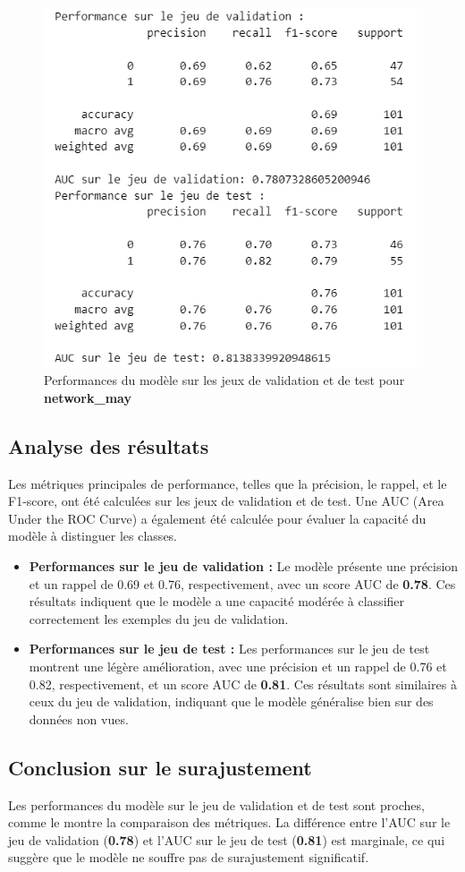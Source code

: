 \begin{figure}[H]
    \centering
    \includegraphics[width=0.7\linewidth]{OVERFIT.png}
    \caption{Performances du modèle sur les jeux de validation et de test pour \textbf{network\_may}}
    \label{fig:overfit}
\end{figure}

\subsection{Analyse des résultats}
Les métriques principales de performance, telles que la précision, le rappel, et le F1-score, ont été calculées sur les jeux de validation et de test. Une AUC (Area Under the ROC Curve) a également été calculée pour évaluer la capacité du modèle à distinguer les classes.

\begin{itemize}
    \item \textbf{Performances sur le jeu de validation :} Le modèle présente une précision et un rappel de 0.69 et 0.76, respectivement, avec un score AUC de \textbf{0.78}. Ces résultats indiquent que le modèle a une capacité modérée à classifier correctement les exemples du jeu de validation.
    \item \textbf{Performances sur le jeu de test :} Les performances sur le jeu de test montrent une légère amélioration, avec une précision et un rappel de 0.76 et 0.82, respectivement, et un score AUC de \textbf{0.81}. Ces résultats sont similaires à ceux du jeu de validation, indiquant que le modèle généralise bien sur des données non vues.
\end{itemize}

\subsection{Conclusion sur le surajustement}
Les performances du modèle sur le jeu de validation et de test sont proches, comme le montre la comparaison des métriques. La différence entre l'AUC sur le jeu de validation (\textbf{0.78}) et l'AUC sur le jeu de test (\textbf{0.81}) est marginale, ce qui suggère que le modèle ne souffre pas de surajustement significatif.

